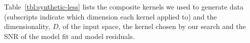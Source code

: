 \documentclass[twoside]{article}
\begin{document}
Table~\ref{tbl:synthetic-less} lists the composite kernels we used to generate data (subscripts indicate which dimension each kernel applied to) and the dimensionality, $D$, of the input space, the kernel chosen by our search and the SNR of the model fit and model residuals.
\end{document}
